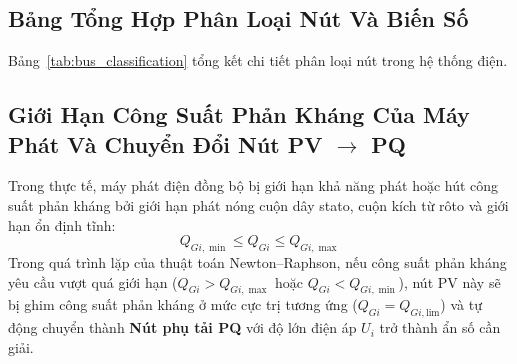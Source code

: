 \documentclass[12pt,a4paper,oneside]{report}
\begin{document}
\subsection{Bảng Tổng Hợp Phân Loại Nút Và Biến Số}
Bảng~\ref{tab:bus_classification} tổng kết chi tiết phân loại nút trong hệ thống điện.

\begin{table}[H]
\centering
\caption{Phân loại các nút và biến số trong bài toán trào lưu công suất AC.}
\label{tab:bus_classification}
\end{table}

\subsection{Giới Hạn Công Suất Phản Kháng Của Máy Phát Và Chuyển Đổi Nút PV $\to$ PQ}
Trong thực tế, máy phát điện đồng bộ bị giới hạn khả năng phát hoặc hút công suất phản kháng bởi giới hạn phát nóng cuộn dây stato, cuộn kích từ rôto và giới hạn ổn định tĩnh:
\begin{equation}
Q_{Gi,\min} \le Q_{Gi} \le Q_{Gi,\max}
\end{equation}
Trong quá trình lặp của thuật toán Newton--Raphson, nếu công suất phản kháng yêu cầu vượt quá giới hạn ($Q_{Gi} > Q_{Gi,\max}$ hoặc $Q_{Gi} < Q_{Gi,\min}$), nút PV này sẽ bị ghim công suất phản kháng ở mức cực trị tương ứng ($Q_{Gi} = Q_{Gi,\text{lim}}$) và tự động chuyển thành \textbf{Nút phụ tải PQ} với độ lớn điện áp $U_i$ trở thành ẩn số cần giải.
\end{document}
